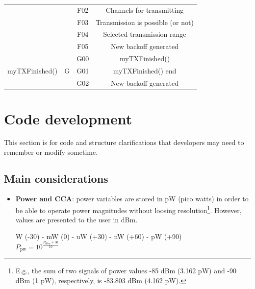 \documentclass[a4paper]{article}
\begin{document}
\begin{table}[]
\begin{tabular}{|c|c|c|c|}
                                           &                     & F02               & Channels for transmitting                               \\ \cline{3-4} 
                                           &                     & F03               & Transmission is possible (or not)                       \\ \cline{3-4} 
                                           &                     & F04               & Selected transmission range                             \\ \cline{3-4} 
                                           &                     & F05               & New backoff generated                                   \\ \hline
\multirow{3}{*}{myTXFinished()}            & \multirow{3}{*}{G}  & G00               & myTXFinished()                                          \\ \cline{3-4} 
                                           &                     & G01               & myTXFinished() end                                      \\ \cline{3-4} 
                                           &                     & G02               & New backoff generated                                   \\ \hline
\end{tabular}
\end{table}











\section{Code development}

This section is for code and structure clarifications that developers may need to remember or modify sometime. 

\subsection{Main considerations}
\begin{itemize}
\item \textbf{Power and CCA}: power variables are stored in pW (pico watts) in order to be able to operate power magnitudes without loosing resolution\footnote{E.g., the sum of two signals of power values -85 dBm (3.162 pW) and -90 dBm (1 pW), respectively, is -83.803 dBm (4.162 pW).}. However, values are presented to the user in dBm.

W (-30)  - mW (0)  - uW (+30) - nW (+60) - pW (+90)\\
$P_{\text{pw}} = 10^{\frac{P_{\text{dBm}} + 90}{10}}$
\end{itemize}
\end{document}
